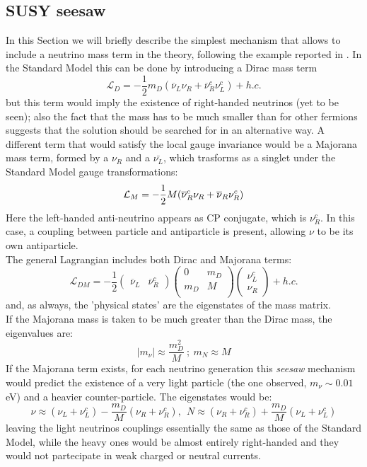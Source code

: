 \documentclass[12pt,a4paper,openright, oneside, titlepage]{book} %
\begin{document}
\subsection{SUSY seesaw}
In this Section we will briefly describe the simplest mechanism 
that allows to include a neutrino mass term in the theory, 
following the example reported in \cite{Thomson}. 
In the Standard Model this can be done by introducing a Dirac mass term
$$\mathcal{L}_D=-\frac{1}{2}m_D(\overline{\nu}_L\nu_R+\overline{\nu}_R^c\nu_L^c) + h.c.$$
but this term would imply the existence of right-handed neutrinos (yet to be seen); also the fact that the mass has to be much smaller than for other fermions suggests that the solution should be searched for in an alternative way.
A different term that would satisfy the local gauge invariance would be a Majorana mass term, formed by a $\nu_R$ and a $\bar{\nu_L}$, which trasforms as a singlet under the Standard Model gauge transformations:
$$\mathcal{L}_M=-\frac{1}{2} M(\overline{\nu}\vphantom{\nu}_R^c\nu_R+\overline{\nu}_R\nu_R^c)$$
Here the left-handed anti-neutrino appears as CP conjugate, which is $\nu_R^c$.
In this case, a coupling between particle and antiparticle is present, allowing $\nu$ to be its own antiparticle.\\
The general Lagrangian includes both Dirac and Majorana terms:
$$\mathcal{L}_{DM}= -\frac{1}{2}
\begin{pmatrix} 
\overline{\nu}_L & \overline{\nu}_R^c 
\end{pmatrix}
\begin{pmatrix} 
0 & m_D\\
m_D & M\\
\end{pmatrix}
\begin{pmatrix} 
\nu_L^c\\
\nu_R
\end{pmatrix} + h.c.$$
and, as always, the 'physical states' are the eigenstates of the mass matrix.\\
If the Majorana mass is taken to be much greater than the Dirac mass, 
the eigenvalues are:
$$
|m_\nu|\approx \frac{m_D^2}{M}\ ;\ m_N\approx M
$$
If the Majorana term exists, for each neutrino generation
this \textit{seesaw} mechanism would predict the existence of a very light particle 
(the one observed, $m_\nu\sim0.01$ eV) and a heavier counter-particle.
The eigenstates would be:
$$
\nu\approx (\nu_L+\nu_L^c)-\frac{m_D}{M}(\nu_R+\nu_R^c),\ \
N\approx (\nu_R+\nu_R^c)+\frac{m_D}{M}(\nu_L+\nu_L^c)
$$
leaving the light neutrinos couplings essentially the same 
as those of the Standard Model, 
while the heavy ones would be almost entirely right-handed 
and they would not partecipate in weak charged or neutral currents.
\end{document}
